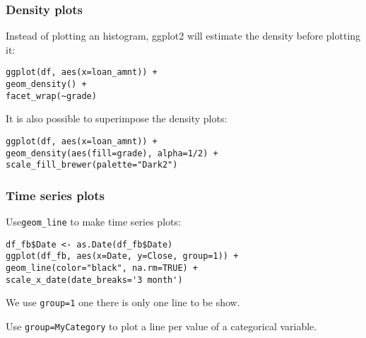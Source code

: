 \documentclass{beamer}
\begin{document}
	\begin{frame}[fragile]
		\frametitle{Density plots}

		Instead of plotting an histogram, ggplot2 will estimate the density before plotting it:

		\vspace{1em}

		\begin{exampleblock}{}
		\begin{BVerbatim}
ggplot(df, aes(x=loan_amnt)) + 
geom_density() + 
facet_wrap(~grade)
		\end{BVerbatim}
		\end{exampleblock}{}

		\vspace{1em}

		It is also possible to superimpose the density plots:

		\vspace{1em}
	
		\begin{exampleblock}{}
		\begin{BVerbatim}
ggplot(df, aes(x=loan_amnt)) + 
geom_density(aes(fill=grade), alpha=1/2) +
scale_fill_brewer(palette="Dark2")
		\end{BVerbatim}
		\end{exampleblock}{}

	\end{frame}

	\begin{frame}[fragile]
		\frametitle{Time series plots}

		Use\verb|geom_line| to make time series plots:

		\vspace{2em}

		\begin{exampleblock}{}
		\begin{BVerbatim}
df_fb$Date <- as.Date(df_fb$Date)
ggplot(df_fb, aes(x=Date, y=Close, group=1)) + 
geom_line(color="black", na.rm=TRUE) +
scale_x_date(date_breaks='3 month')
		\end{BVerbatim}
		\end{exampleblock}{}

		\vspace{2em}

		We use \verb|group=1| one there is only one line to be show.

		\vspace{2em}

		Use \verb|group=MyCategory| to plot a line per value of a categorical variable.

	\end{frame}
\end{document}
